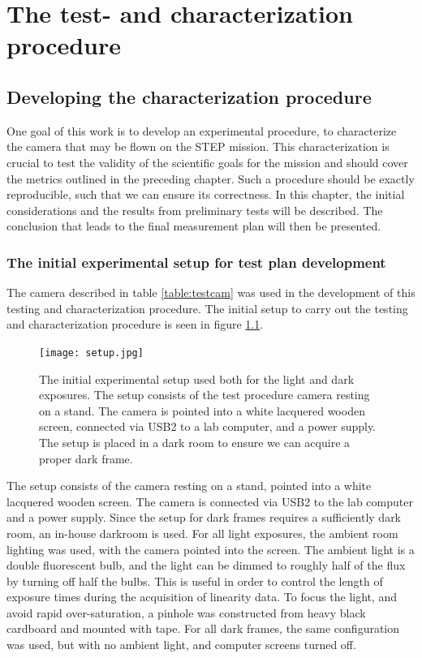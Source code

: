 \documentclass[../main.tex]{subfiles}
\begin{document}
	
	\chapter{The test- and characterization procedure}
		\section{Developing the characterization procedure}
		One goal of this work is to develop an experimental procedure, to characterize the camera that may be flown on the STEP mission. This characterization is crucial to test the validity of the scientific goals for the mission and should cover the metrics outlined in the preceding chapter. Such a procedure should be exactly reproducible, such that we can ensure its correctness. In this chapter, the initial considerations and the results from preliminary tests will be described. The conclusion that leads to the final measurement plan will then be presented.
		
		\subsection{The initial experimental setup for test plan development}
		The camera described in table \ref{table:testcam} was used in the development of this testing and characterization procedure. The initial setup to carry out the testing and characterization procedure is seen in figure \ref{fig:setup}. 
		
		\begin{figure}
			\centering
			\texttt{[image: setup.jpg]}
			\caption{The initial experimental setup used both for the light and dark exposures. The setup consists of the test procedure camera resting on a stand. The camera is pointed into a white lacquered wooden screen, connected via USB2 to a lab computer, and a power supply. The setup is placed in a dark room to ensure we can acquire a proper dark frame.}
			\label{fig:setup}
		\end{figure}
		
		The setup consists of the camera resting on a stand, pointed into a white lacquered wooden screen. The camera is connected via USB2 to the lab computer and a power supply. Since the setup for dark frames requires a sufficiently dark room, an in-house darkroom is used.
		For all light exposures, the ambient room lighting was used, with the camera pointed into the screen. The ambient light is a double fluorescent bulb, and the light can be dimmed to roughly half of the flux by turning off half the bulbs. This is useful in order to control the length of exposure times during the acquisition of linearity data. To focus the light, and avoid rapid over-saturation, a pinhole was constructed from heavy black cardboard and mounted with tape.
		For all dark frames, the same configuration was used, but with no ambient light, and computer screens turned off. 
		
\end{document}
